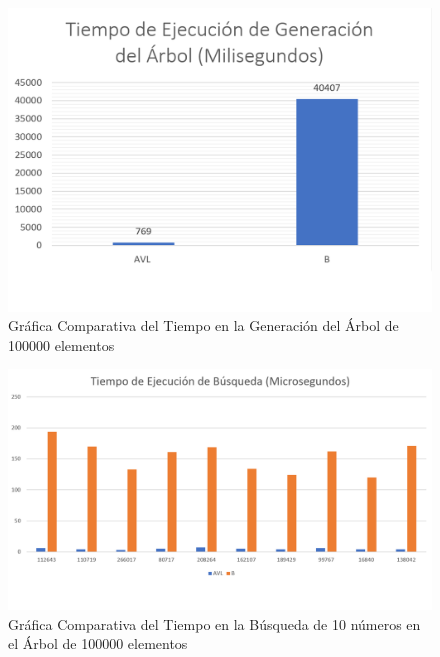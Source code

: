 \documentclass[acmsmall]{acmart}
\begin{document}
\begin{figure}[ht]
  \centering
  \caption{Gráfica Comparativa del Tiempo en la Generación del Árbol de 100000 elementos}

  \includegraphics[angle=0,scale=0.6]{100000.1 elem.png}
  
\end{figure}
\begin{figure}[ht]
  \centering
  \caption{Gráfica Comparativa del Tiempo en la Búsqueda de 10 números en el Árbol de 100000 elementos}

  \includegraphics[angle=0,scale=0.53]{100000.2 elem.png}
  
\end{figure}
\end{document}
